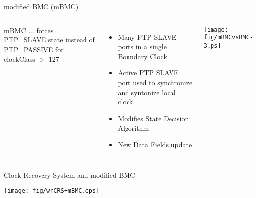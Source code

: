 \documentclass[compress,red]{beamer}
\begin{document}
\begin{frame}{modified BMC (mBMC)}

\begin{columns}[c]

    \begin{block}{mBMC}
    ... forces PTP\_SLAVE state instead of PTP\_PASSIVE for clockClass $>$ 127
    \end{block}

    \begin{itemize}
	\item Many PTP SLAVE ports in a single Boundary Clock
	\item Active PTP SLAVE port used to synchronize and syntonize local clock
	\item Modifies State Decision Algorithm
	\item New Data Fields update
      \end{itemize}

    \begin{center}
    \texttt{[image: fig/mBMCvsBMC-3.ps]}
    \end{center}

\end{columns}

\end{frame}
\begin{frame}{Clock Recovery System and modified BMC}


  \begin{center}
  \texttt{[image: fig/wrCRS+mBMC.eps]}
  \end{center}

\end{frame}
\end{document}
